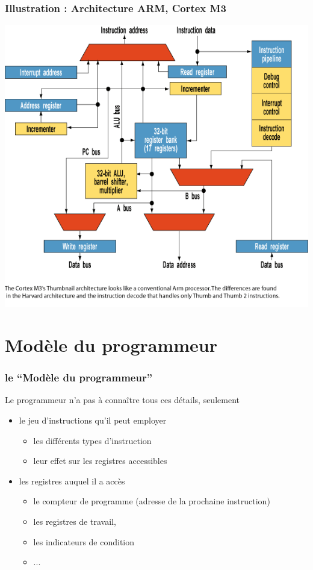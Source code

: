 \begin{frame}
  \frametitle{Illustration : Architecture ARM, Cortex M3}
  \begin{center}
    
  \includegraphics[width=0.6\linewidth]{images/arm-arch.png}
  \end{center}
\end{frame}

\section{Modèle du programmeur}

\begin{frame}
\frametitle{le ``Modèle du programmeur''}
  Le programmeur n'a pas à connaître tous ces détails, seulement 
\begin{itemize}
\item le jeu d'instructions qu'il peut employer

\begin{itemize}
\item les \alert{différents types d'instruction}
\item leur effet sur les registres accessibles
\end{itemize}
\item les registres auquel il a accès
  \begin{itemize}
  \item le \alert{compteur de programme} (adresse de la prochaine instruction)
  \item les \alert{registres} de travail,
\item les \alert{indicateurs de condition}
\item ...
  \end{itemize}
\end{itemize}
\end{frame}


